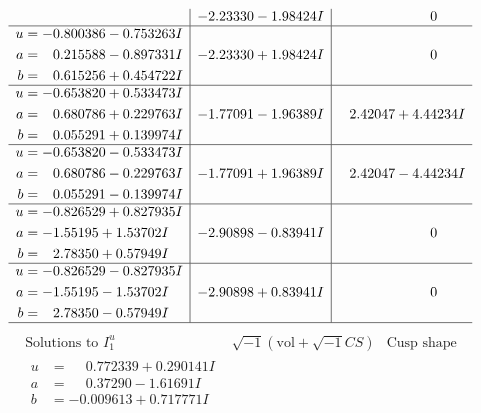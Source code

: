 \documentclass[1p]{elsarticle_modified}
\theoremstyle{definition}
\newcommand{\I}{\sqrt{-1}}
\begin{document}
$$\begin{array}{c|c|c}
 & -2.23330 - 1.98424 I & \phantom{-0.000000 } 0 \\ \hline\begin{aligned}
u &= -0.800386 - 0.753263 I \\
a &= \phantom{-}0.215588 - 0.897331 I \\
b &= \phantom{-}0.615256 + 0.454722 I\end{aligned}
 & -2.23330 + 1.98424 I & \phantom{-0.000000 } 0 \\ \hline\begin{aligned}
u &= -0.653820 + 0.533473 I \\
a &= \phantom{-}0.680786 + 0.229763 I \\
b &= \phantom{-}0.055291 + 0.139974 I\end{aligned}
 & -1.77091 - 1.96389 I & \phantom{-}2.42047 + 4.44234 I \\ \hline\begin{aligned}
u &= -0.653820 - 0.533473 I \\
a &= \phantom{-}0.680786 - 0.229763 I \\
b &= \phantom{-}0.055291 - 0.139974 I\end{aligned}
 & -1.77091 + 1.96389 I & \phantom{-}2.42047 - 4.44234 I \\ \hline\begin{aligned}
u &= -0.826529 + 0.827935 I \\
a &= -1.55195 + 1.53702 I \\
b &= \phantom{-}2.78350 + 0.57949 I\end{aligned}
 & -2.90898 - 0.83941 I & \phantom{-0.000000 } 0 \\ \hline\begin{aligned}
u &= -0.826529 - 0.827935 I \\
a &= -1.55195 - 1.53702 I \\
b &= \phantom{-}2.78350 - 0.57949 I\end{aligned}
 & -2.90898 + 0.83941 I & \phantom{-0.000000 } 0\\
 \hline 
 \end{array}$$\newpage$$\begin{array}{c|c|c}  
\text{Solutions to }I^u_{1}& \I (\text{vol} + \sqrt{-1}CS) & \text{Cusp shape}\\
 \hline 
\begin{aligned}
u &= \phantom{-}0.772339 + 0.290141 I \\
a &= \phantom{-}0.37290 - 1.61691 I \\
b &= -0.009613 + 0.717771 I\end{aligned}

\end{array}$$
\end{document}
